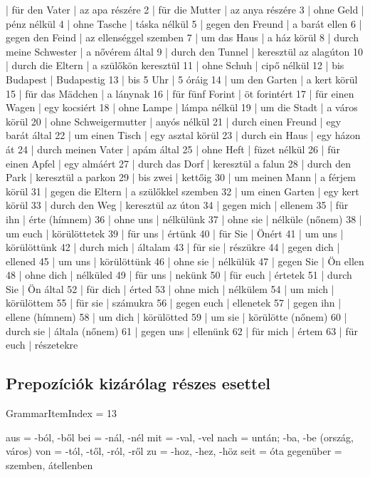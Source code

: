 \documentclass{article}
\newenvironment{desc}{\verbatim}{\endverbatim}
\newenvironment{exmp}{\verbatim}{\endverbatim}
\begin{document}
\begin{exmp}
1 | für den Vater | az apa részére
2 | für die Mutter | az anya részére
3 | ohne Geld | pénz nélkül
4 | ohne Tasche | táska nélkül
5 | gegen den Freund | a barát ellen
6 | gegen den Feind | az ellenséggel szemben
7 | um das Haus | a ház körül
8 | durch meine Schwester | a nővérem által
9 | durch den Tunnel | keresztül az alagúton
10 | durch die Eltern | a szülőkön keresztül
11 | ohne Schuh | cipő nélkül
12 | bis Budapest | Budapestig
13 | bis 5 Uhr | 5 óráig
14 | um den Garten | a kert körül
15 | für das Mädchen | a lánynak
16 | für fünf Forint | öt forintért
17 | für einen Wagen | egy kocsiért
18 | ohne Lampe | lámpa nélkül
19 | um die Stadt | a város körül
20 | ohne Schweigermutter | anyós nélkül
21 | durch einen Freund | egy barát által
22 | um einen Tisch | egy asztal körül
23 | durch ein Haus | egy házon át
24 | durch meinen Vater | apám által
25 | ohne Heft | füzet nélkül
26 | für einen Apfel | egy almáért
27 | durch das Dorf | keresztül a falun
28 | durch den Park | keresztül a parkon
29 | bis zwei | kettőig
30 | um meinen Mann | a férjem körül
31 | gegen die Eltern | a szülőkkel szemben
32 | um einen Garten | egy kert körül
33 | durch den Weg | keresztül az úton
34 | gegen mich | ellenem
35 | für ihn | érte (hímnem)
36 | ohne uns | nélkülünk
37 | ohne sie | nélküle (nőnem)
38 | um euch | körülöttetek
39 | für uns | értünk
40 | für Sie | Önért
41 | um uns | körülöttünk
42 | durch mich | általam
43 | für sie | részükre
44 | gegen dich | ellened
45 | um uns | körülöttünk
46 | ohne sie | nélkülük
47 | gegen Sie | Ön ellen
48 | ohne dich | nélküled
49 | für uns | nekünk
50 | für euch | értetek
51 | durch Sie | Ön által
52 | für dich | érted
53 | ohne mich | nélkülem
54 | um mich | körülöttem
55 | für sie | számukra
56 | gegen euch | ellenetek
57 | gegen ihn | ellene (hímnem)
58 | um dich | körülötted
59 | um sie | körülötte (nőnem)
60 | durch sie | általa (nőnem)
61 | gegen uns | ellenünk
62 | für mich | értem
63 | für euch | részetekre
\end{exmp}

\subsection{Prepozíciók kizárólag részes esettel}

GrammarItemIndex = 13

\begin{desc}
\begin{enumerate}
aus = -ból, -ből
bei = -nál, -nél
mit = -val, -vel
nach = untán; -ba, -be (ország, város)
von = -tól, -től, -ról, -ről
zu = -hoz, -hez, -höz
seit = óta
gegenüber = szemben, átellenben
\end{enumerate}
\end{desc}
\end{document}
